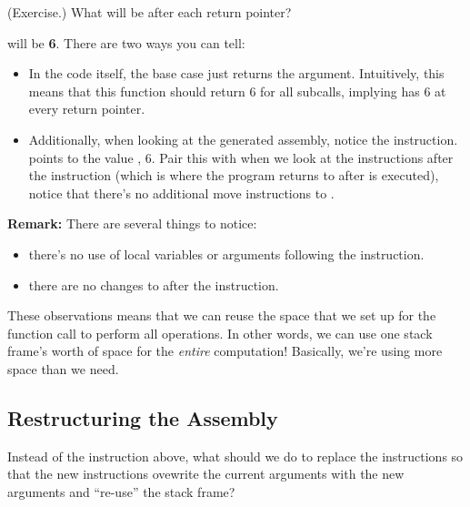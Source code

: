 \documentclass[letterpaper]{article}
\begin{document}
\begin{mdframed}
    (Exercise.) What will  be after each return pointer? 

    \begin{mdframed}
         will be \textbf{6}. There are two ways you can tell: 
        \begin{itemize}
            \item In the code itself, the base case just returns the  argument. Intuitively, this means that this function should return 6 for all subcalls, implying  has 6 at every return pointer. 
            \item Additionally, when looking at the generated assembly, notice the  instruction. \code{[rsp + 32]} points to the value , 6. Pair this with when we look at the instructions after the  instruction (which is where the program returns to after  is executed), notice that there's no additional move instructions to . 
        \end{itemize}
    \end{mdframed}
\end{mdframed}
\textbf{Remark:} There are several things to notice:
\begin{itemize}
    \item there's no use of local variables or arguments following the  instruction. 
    \item there are no changes to  after the  instruction.
\end{itemize}
These observations means that we can reuse the space that we set up for the function call to perform all operations. In other words, we can use one stack frame's worth of space for the \emph{entire} computation! Basically, we're using more space than we need. 

\subsection{Restructuring the Assembly}
Instead of the  instruction above, what should we do to replace the instructions so that the new instructions ovewrite the current arguments with the new arguments and ``re-use'' the stack frame? 

\bigskip 
\end{document}
